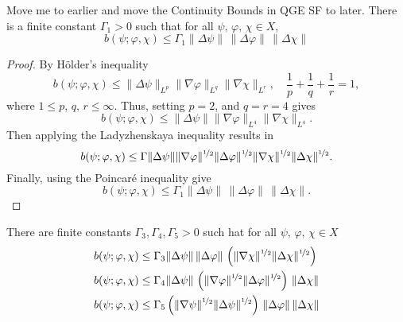 \begin{lemma} \label{lma:BH2Bounds}
  {\color{red} \LARGE Move me to earlier and move the Continuity Bounds in QGE
SF to later.} There is a finite constant $\Gamma_1>0$ such that for all $\psi,\, \varphi,\,
  \chi \in X$,
  \begin{equation}
    b(\psi;\varphi,\chi) \le \Gamma_1 \|\Delta \psi\|\, \|\Delta \varphi\|\,
      \|\Delta \chi\|
    \label{eqn:BH2Bounds}
  \end{equation}
\end{lemma}
\begin{proof}
  By H\"older's inequality
  \begin{equation}
    b(\psi;\varphi,\chi) \le \|\Delta \psi\|_{L^p} \|\nabla \varphi\|_{L^q}
      \|\nabla \chi\|_{L^r},\quad \frac{1}{p}+\frac{1}{q}+\frac{1}{r}=1,
    \label{eqn:HolderB}
  \end{equation}
  where $1\le p,\,q,\,r\le \infty$. Thus, setting $p = 2$, and $q = r = 4$ gives
  \begin{equation*}
    b(\psi;\varphi,\chi) \le \|\Delta \psi\| \|\nabla \varphi\|_{L^4} \|\nabla
      \chi\|_{L^4}.
  \end{equation*}
  Then applying the Ladyzhenskaya inequality results in
  \begin{equation*}
    b(\psi;\varphi,\chi) \le \Gamma \|\Delta \psi\|
      \|\nabla \varphi\|^{\nicefrac{1}{2}} \|\Delta \varphi\|^{\nicefrac{1}{2}}
      \|\nabla \chi\|^{\nicefrac{1}{2}} \|\Delta \chi\|^{\nicefrac{1}{2}}.
  \end{equation*}
  Finally, using the Poincar\'e inequality give
  \begin{equation*}
    b(\psi;\varphi,\chi) \le \Gamma_1 \|\Delta \psi\|\, \|\Delta \varphi\|\,
      \|\Delta \chi\|.
  \end{equation*}
\end{proof}
\begin{lemma} \label{lma:BH1Bound}
  There are finite constants $\Gamma_3,\Gamma_4,\Gamma_5>0$ such hat for all
  $\psi,\, \varphi,\, \chi \in X$
  \begin{align}
    b(\psi;\varphi,\chi) &\le \Gamma_3 \|\Delta \psi\|\, \|\Delta \varphi\|\,
      \left(\|\nabla \chi\|^{\nicefrac{1}{2}}
      \|\Delta \chi\|^{\nicefrac{1}{2}}\right) \label{eqn:BH1BoundChi} \\
    b(\psi;\varphi,\chi) &\le \Gamma_4 \|\Delta \psi\|\,
      \left(\|\nabla \varphi\|^{\nicefrac{1}{2}}
      \|\Delta \varphi\|^{\nicefrac{1}{2}}\right)\,
      \|\Delta \chi\| \label{eqn:BH1BoundPhi} \\
    b(\psi;\varphi,\chi) &\le \Gamma_5 \left(\|\nabla \psi\|^{\nicefrac{1}{2}}
      \|\Delta \psi\|^{\nicefrac{1}{2}}\right)\,
      \|\Delta \varphi\|\, \|\Delta \chi\| \label{eqn:BH1BoundPsi}
  \end{align}
\end{lemma}
